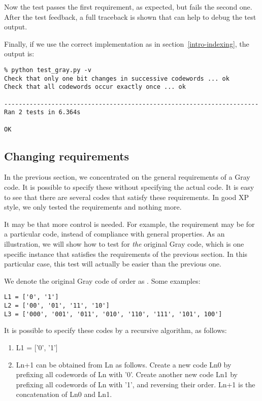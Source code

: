 Now the test passes the first requirement, as expected, but fails the
second one. After the test feedback, a full traceback is shown that
can help to debug the test output.

Finally, if we use the correct implementation as in
section~\ref{intro-indexing}, the output is:

\begin{verbatim}
% python test_gray.py -v
Check that only one bit changes in successive codewords ... ok
Check that all codewords occur exactly once ... ok

----------------------------------------------------------------------
Ran 2 tests in 6.364s

OK
\end{verbatim}



\subsection{Changing requirements \label{unittest-change}}

In the previous section, we concentrated on the general requirements
of a Gray code. It is possible to specify these without specifying the
actual code. It is easy to see that there are several codes
that satisfy these requirements. In good XP style, we only tested
the requirements and nothing more.

It may be that more control is needed. For example, the requirement
may be for a particular code, instead of compliance with general
properties. As an illustration, we will show how to test for
\emph{the} original Gray code, which is one specific instance that
satisfies the requirements of the previous section. In this particular
case, this test will actually be easier than the previous one.

We denote the original Gray code of order  as . Some
examples: 

\begin{verbatim}
L1 = ['0', '1']
L2 = ['00', '01', '11', '10']
L3 = ['000', '001', '011', '010', '110', '111', '101', 100']
\end{verbatim}

It is possible to specify these codes by a recursive algorithm, as
follows:

\begin{enumerate}
\item L1 = ['0', '1']
\item Ln+1 can be obtained from Ln as follows. Create a new code Ln0 by
prefixing all codewords of Ln with '0'. Create another new code Ln1 by
prefixing all codewords of Ln with '1', and reversing their
order. Ln+1 is the concatenation of Ln0 and Ln1.
\end{enumerate}

